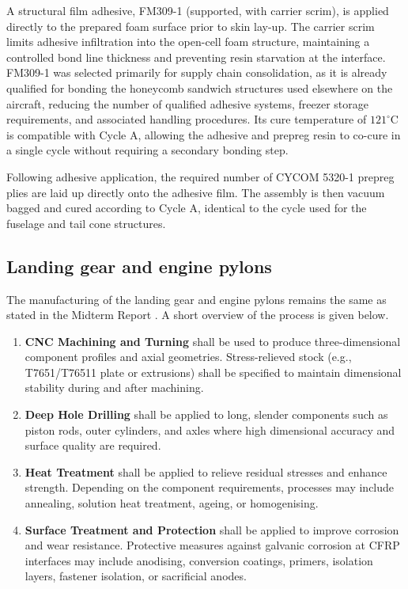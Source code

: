 A structural film adhesive, FM309-1 (supported, with carrier scrim), is applied directly to the prepared foam surface prior to skin lay-up. The carrier scrim limits adhesive infiltration into the open-cell foam structure, maintaining a controlled bond line thickness and preventing resin starvation at the interface. FM309-1 was selected primarily for supply chain consolidation, as it is already qualified for bonding the honeycomb sandwich structures used elsewhere on the aircraft, reducing the number of qualified adhesive systems, freezer storage requirements, and associated handling procedures. Its cure temperature of $121^\circ$C is compatible with Cycle A, allowing the adhesive and prepreg resin to co-cure in a single cycle without requiring a secondary bonding step.

Following adhesive application, the required number of CYCOM 5320-1 prepreg plies are laid up directly onto the adhesive film. The assembly is then vacuum bagged and cured according to Cycle A, identical to the cycle used for the fuselage and tail cone structures.

\subsection{Landing gear and engine pylons}
\label{sub:manufacturing_LG}

The manufacturing of the landing gear and engine pylons remains the same as stated in the Midterm Report . A short overview of the process is given below.

\begin{enumerate}
\item \textbf{CNC Machining and Turning} shall be used to produce three-dimensional component profiles and axial geometries. Stress-relieved stock (e.g., T7651/T76511 plate or extrusions) shall be specified to maintain dimensional stability during and after machining.

\item \textbf{Deep Hole Drilling} shall be applied to long, slender components such as piston rods, outer cylinders, and axles where high dimensional accuracy and surface quality are required.

\item \textbf{Heat Treatment} shall be applied to relieve residual stresses and enhance strength. Depending on the component requirements, processes may include annealing, solution heat treatment, ageing, or homogenising.

\item \textbf{Surface Treatment and Protection} shall be applied to improve corrosion and wear resistance. Protective measures against galvanic corrosion at CFRP interfaces may include anodising, conversion coatings, primers, isolation layers, fastener isolation, or sacrificial anodes.

\end{enumerate}



